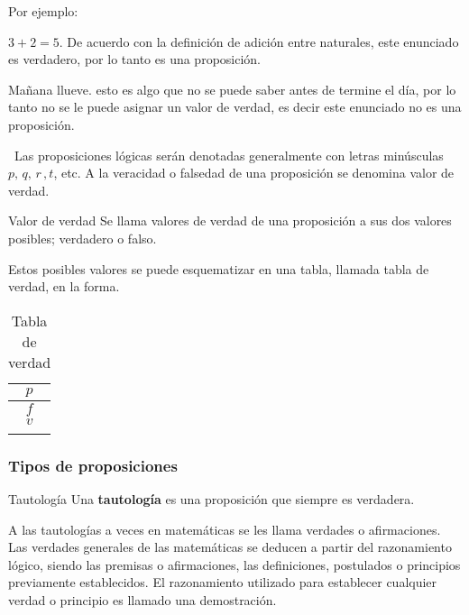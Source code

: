 Por ejemplo: 

\begin{lista} 

\item $3+2=5$. De acuerdo con la definición de adición entre naturales,
este enunciado es verdadero, por lo tanto es una proposición. 

\item Mañana llueve. esto es algo que no se puede saber antes de
termine el día, por lo tanto no se le puede asignar un valor de verdad,
es decir este enunciado no es una proposición.

\end{lista} 

\notacion\ Las proposiciones lógicas serán denotadas generalmente
con letras minúsculas $p,\, q,\, r\,,t$, etc. A la veracidad o falsedad
de una proposición se denomina valor de verdad. 

\begin{definicionn}{ Valor de verdad } Se llama valores de verdad
de una proposición a sus dos valores posibles; verdadero o falso.
\end{definicionn}

Estos posibles valores se puede esquematizar en una tabla, llamada
tabla de verdad, en la forma. 

\begin{table}[H]
\centering

\caption{Tabla de verdad}


\begin{tabular}{c}
\tabularnewline[6ex]\arrayrulecolor{ptctitle}\hline\cellcolor{gray!50}$p$\tabularnewline
\hline\cellcolor{ptcbackground}$f$\tabularnewline
\hline\cellcolor{ptcbackground}$v$\tabularnewline\arrayrulecolor{ptctitle}\hline\tabularnewline
\end{tabular}
\end{table}



\subsubsection{Tipos de proposiciones}

\begin{ideas}{Tautología} Una \textbf{tautología} es una proposición
que siempre es verdadera. 

\end{ideas}

A las tautologías a veces en matemáticas se les llama verdades o afirmaciones.
Las verdades generales de las matemáticas se deducen a partir del
razonamiento lógico, siendo las premisas o afirmaciones, las definiciones,
postulados o principios previamente establecidos. El razonamiento
utilizado para establecer cualquier verdad o principio es llamado
una demostración.

